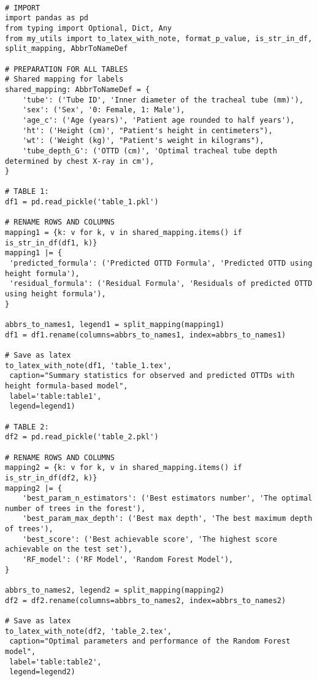 \documentclass[11pt]{article}
\begin{document}
\begin{verbatim}

# IMPORT
import pandas as pd
from typing import Optional, Dict, Any
from my_utils import to_latex_with_note, format_p_value, is_str_in_df, split_mapping, AbbrToNameDef

# PREPARATION FOR ALL TABLES
# Shared mapping for labels
shared_mapping: AbbrToNameDef = {
    'tube': ('Tube ID', 'Inner diameter of the tracheal tube (mm)'),
    'sex': ('Sex', '0: Female, 1: Male'),
    'age_c': ('Age (years)', 'Patient age rounded to half years'),
    'ht': ('Height (cm)', "Patient's height in centimeters"),
    'wt': ('Weight (kg)', "Patient's weight in kilograms"),
    'tube_depth_G': ('OTTD (cm)', 'Optimal tracheal tube depth determined by chest X-ray in cm'),
}

# TABLE 1:
df1 = pd.read_pickle('table_1.pkl')

# RENAME ROWS AND COLUMNS
mapping1 = {k: v for k, v in shared_mapping.items() if is_str_in_df(df1, k)} 
mapping1 |= {
 'predicted_formula': ('Predicted OTTD Formula', 'Predicted OTTD using height formula'),
 'residual_formula': ('Residual Formula', 'Residuals of predicted OTTD using height formula'),
}

abbrs_to_names1, legend1 = split_mapping(mapping1)
df1 = df1.rename(columns=abbrs_to_names1, index=abbrs_to_names1)

# Save as latex
to_latex_with_note(df1, 'table_1.tex',
 caption="Summary statistics for observed and predicted OTTDs with height formula-based model", 
 label='table:table1',
 legend=legend1)

# TABLE 2:
df2 = pd.read_pickle('table_2.pkl')

# RENAME ROWS AND COLUMNS
mapping2 = {k: v for k, v in shared_mapping.items() if is_str_in_df(df2, k)} 
mapping2 |= {
    'best_param_n_estimators': ('Best estimators number', 'The optimal number of trees in the forest'),
    'best_param_max_depth': ('Best max depth', 'The best maximum depth of trees'),
    'best_score': ('Best achievable score', 'The highest score achievable on the test set'),
    'RF_model': ('RF Model', 'Random Forest Model'),
}

abbrs_to_names2, legend2 = split_mapping(mapping2)
df2 = df2.rename(columns=abbrs_to_names2, index=abbrs_to_names2)

# Save as latex
to_latex_with_note(df2, 'table_2.tex',
 caption="Optimal parameters and performance of the Random Forest model", 
 label='table:table2',
 legend=legend2)


\end{verbatim}
\end{document}
